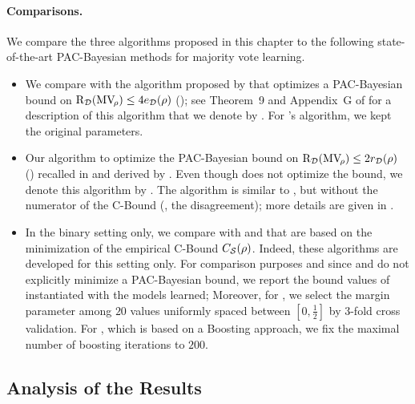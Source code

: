 \paragraph{Comparisons.}
We compare the three algorithms proposed in this chapter to the following state-of-the-art PAC-Bayesian methods for majority vote learning.
\begin{itemize}
    \item We compare with the algorithm proposed by \citet{MasegosaLorenzenIgelSeldin2020} that optimizes a PAC-Bayesian bound on $\text{R}_{\mathcal{D}}(\text{MV}_{\!\rho}) \le 4e_{\mathcal{D}}(\rho)$ (); see Theorem~9 and Appendix~G of \citep{MasegosaLorenzenIgelSeldin2020} for a description of this algorithm that we denote by \algomasegosa.
    For \citeauthor{MasegosaLorenzenIgelSeldin2020}'s algorithm, we kept the original parameters.

    \item Our algorithm to optimize the PAC-Bayesian bound on $\text{R}_{\mathcal{D}}(\text{MV}_{\!\rho}) \le 2r_{\mathcal{D}}(\rho)$ () recalled in  and derived by \citep[PAC-Bound 0]{GermainLacasseLavioletteMarchandRoy2015}.
    Even though \citep{GermainLacasseLavioletteMarchandRoy2015} does not optimize the bound, we denote this algorithm by \algogermain.
    The algorithm is similar to , but without the numerator of the C-Bound (\ie, the disagreement); more details are given in .

    \item In the binary setting only, we compare with \mincq \citep{RoyLavioletteMarchand2011} and \cbboost \citep{BauvinCapponiRoyLaviolette2020} that are based on the minimization of the empirical C-Bound ${C}_{\mathcal{S}}(\rho)$.
    Indeed, these algorithms are developed for this setting only.
    For comparison purposes and since \mincq and \cbboost do not explicitly minimize a PAC-Bayesian bound, we report the bound values of  instantiated with the models learned;
    Moreover, for \mincq, we select the margin parameter among $20$ values uniformly spaced between $[0,\tfrac{1}{2}]$ by 3-fold cross validation. 
    For \cbboost, which is based on a Boosting approach, we fix the maximal number of boosting iterations to $200$.
\end{itemize}

\subsection{Analysis of the Results}

